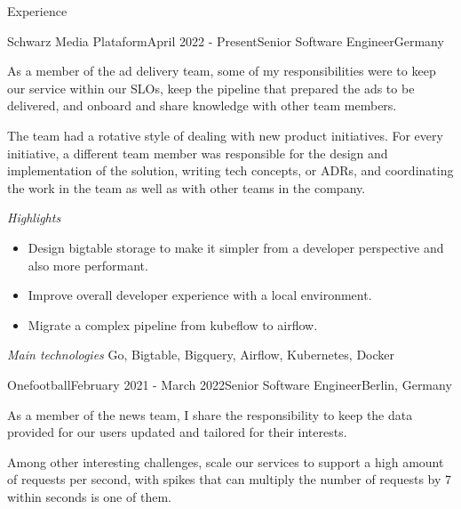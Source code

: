 \documentclass[
	a4paper, %
	10pt, %
]{resume} %
\begin{document}
\begin{rSection}{Experience}

	\begin{rSubsection}{Schwarz Media Plataform}{April 2022 - Present}{Senior Software Engineer}{Germany}
		\item[]
		As a member of the ad delivery team, some of my responsibilities were to keep our service within our SLOs, keep the pipeline that prepared the ads to be delivered,
		and onboard and share knowledge with other team members.

		The team had a rotative style of dealing with new product initiatives. For every initiative, a different team member was responsible for the design and implementation of the solution,
		writing tech concepts, or ADRs, and coordinating the work in the team as well as with other teams in the company.

		\textit{Highlights}
		\begin{itemize}
			\item Design bigtable storage to make it simpler from a developer perspective and also more performant.
			\item Improve overall developer experience with a local environment.
			\item Migrate a complex pipeline from kubeflow to airflow.
		\end{itemize}

		\textit{Main technologies}
			Go, Bigtable, Bigquery, Airflow, Kubernetes, Docker


	\end{rSubsection}

	\vspace{1mm}

	\begin{rSubsection}{Onefootball}{February 2021 - March 2022}{Senior Software Engineer}{Berlin, Germany}
		\item As a member of the news team, I share the responsibility to keep the data provided for our users updated and tailored for their interests.

Among other interesting challenges, scale our services to support a high amount of requests per second, with spikes that can multiply the number of requests by 7 within seconds is one of them.

	\end{rSubsection}

	\vspace{1mm}


\end{rSection}
\end{document}
